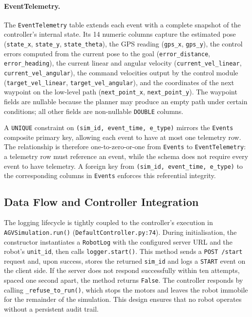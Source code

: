 \paragraph{EventTelemetry.}
The \texttt{EventTelemetry} table extends each event with a complete snapshot of the controller's internal state. Its 14 numeric columns capture the estimated pose (\texttt{state\_x}, \texttt{state\_y}, \texttt{state\_theta}), the GPS reading (\texttt{gps\_x}, \texttt{gps\_y}), the control errors computed from the current pose to the goal (\texttt{error\_distance}, \texttt{error\_heading}), the current linear and angular velocity (\texttt{current\_vel\_linear}, \texttt{current\_vel\_angular}), the command velocities output by the control module (\texttt{target\_vel\_linear}, \texttt{target\_vel\_angular}), and the coordinates of the next waypoint on the low-level path (\texttt{next\_point\_x}, \texttt{next\_point\_y}). The waypoint fields are nullable because the planner may produce an empty path under certain conditions; all other fields are non-nullable \texttt{DOUBLE} columns.

A \texttt{UNIQUE} constraint on \texttt{(sim\_id, event\_time, e\_type)} mirrors the \texttt{Events} composite primary key, allowing each event to have at most one telemetry row. The relationship is therefore one-to-zero-or-one from \texttt{Events} to \texttt{EventTelemetry}: a telemetry row must reference an event, while the schema does not require every event to have telemetry. A foreign key from \texttt{(sim\_id, event\_time, e\_type)} to the corresponding columns in \texttt{Events} enforces this referential integrity.

\subsection{Data Flow and Controller Integration}
\label{sec:logger-data-flow}

The logging lifecycle is tightly coupled to the controller's execution in \texttt{AGVSimulation.run()} (\texttt{DefaultController.py:74}). During initialisation, the constructor instantiates a \texttt{RobotLog} with the configured server URL and the robot's \texttt{unit\_id}, then calls \texttt{logger.start()}. This method sends a \texttt{POST /start} request and, upon success, stores the returned \texttt{sim\_id} and logs a \texttt{START} event on the client side. If the server does not respond successfully within ten attempts, spaced one second apart, the method returns \texttt{False}. The controller responds by calling \texttt{\_refuse\_to\_run()}, which stops the motors and leaves the robot immobile for the remainder of the simulation. This design ensures that no robot operates without a persistent audit trail.

